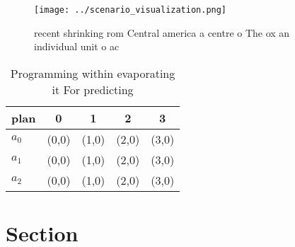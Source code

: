 \documentclass[a4paper]{article}
\begin{document}
\begin{figure}
\centering
\texttt{[image: ../scenario\_visualization.png]}
\caption{ recent shrinking rom Central america a centre o The ox an individual unit o ac
}
\end{figure}
 
\begin{table}
\begin{adjustbox}{width=0.6\columnwidth}
\begin{tabular}{|l|l|l|l|l|}
\hline
\textbf{plan} & \multicolumn{1}{c|}{\textbf{0}} & \multicolumn{1}{c|}{\textbf{1}} & \multicolumn{1}{c|}{\textbf{2}} & \multicolumn{1}{c|}{\textbf{3}} \\ \hline
\textbf{$a_0$}  & (0,0) & (1,0) & (2,0) & (3,0) \\ \hline
\textbf{$a_1$}  & (0,0) & (1,0) & (2,0) & (3,0) \\ \hline
\textbf{$a_2$}  & (0,0) & (1,0) & (2,0) & (3,0) \\ \hline
\end{tabular}
\end{adjustbox}
\caption{Programming within evaporating it For predicting 
}
\end{table}

\section{Section}
\end{document}
